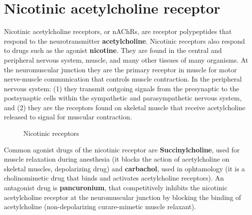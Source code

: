 \documentclass{book}
\begin{document}
\section{Nicotinic acetylcholine receptor}
Nicotinic acetylcholine receptors, or nAChRs, are receptor polypeptides that respond to the neurotransmitter \textbf{acetylcholine}. 
Nicotinic receptors also respond to drugs such as the agonist \textbf{nicotine}. 
They are found in the central and peripheral nervous system, muscle, and many other tissues of many organisms. 
At the neuromuscular junction they are the primary receptor in muscle for motor nerve-muscle communication that controls muscle contraction. 
In the peripheral nervous system: (1) they transmit outgoing signals from the presynaptic to the postsynaptic cells within the sympathetic and parasympathetic nervous system, and (2) they are the receptors found on skeletal muscle that receive acetylcholine released to signal for muscular contraction.

\begin{figure}%
    \centering
    \qquad
    \caption{Nicotinic receptors}%
    \label{fig:example}%
\end{figure}

Common agonist drugs of the nicotinic receptor are \textbf{Succinylcholine}, used for muscle relaxation during anesthesia (it blocks the action of acetylcholine on skeletal muscles, depolarizing drug) and \textbf{carbachol}, used in ophtamology (it is a cholinomimetic drug that binds and activates acetylcholine receptors). 
An antagonist drug is \textbf{pancuronium}, that competitively inhibits the nicotinic acetylcholine receptor at the neuromuscular junction by blocking the binding of acetylcholine (non-depolarizing curare-mimetic muscle relaxant).
\end{document}

